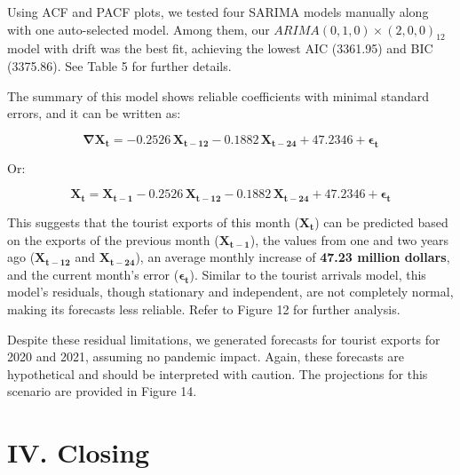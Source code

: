 \documentclass[11pt]{article}
\begin{document}
Using ACF and PACF plots, we tested four SARIMA models manually along with one auto-selected model. Among them, our $ARIMA(0,1,0)\times(2,0,0)_{12}$ model with drift was the best fit, achieving the lowest AIC (3361.95) and BIC (3375.86). See Table 5 for further details.

The summary of this model shows reliable coefficients with minimal standard errors, and it can be written as:

\begin{equation}
\mathbf{\nabla}\mathbf{X}_{\mathbf{t}} = -\mathbf{0.2526}\,\mathbf{X}_{\mathbf{t-12}} - \mathbf{0.1882}\,\mathbf{X}_{\mathbf{t-24}} + \mathbf{47.2346} + \mathbf{\epsilon}_{\mathbf{t}}
\end{equation}

Or:

\begin{equation}
\mathbf{X}_{\mathbf{t}} = \mathbf{X}_{\mathbf{t-1}} -\mathbf{0.2526}\,\mathbf{X}_{\mathbf{t-12}} - \mathbf{0.1882}\,\mathbf{X}_{\mathbf{t-24}} + \mathbf{47.2346} + \mathbf{\epsilon}_{\mathbf{t}}
\end{equation}

This suggests that the tourist exports of this month ($\mathbf{X}_{\mathbf{t}}$) can be predicted based on the exports of the previous month ($\mathbf{X}_{\mathbf{t-1}}$), the values from one and two years ago ($\mathbf{X}_{\mathbf{t-12}}$ and $\mathbf{X}_{\mathbf{t-24}}$), an average monthly increase of \textbf{47.23 million dollars}, and the current month's error ($\mathbf{\epsilon}_{\mathbf{t}}$). Similar to the tourist arrivals model, this model's residuals, though stationary and independent, are not completely normal, making its forecasts less reliable. Refer to Figure 12 for further analysis.

Despite these residual limitations, we generated forecasts for tourist exports for 2020 and 2021, assuming no pandemic impact. Again, these forecasts are hypothetical and should be interpreted with caution. The projections for this scenario are provided in Figure 14.

\section{IV. Closing}
\end{document}
